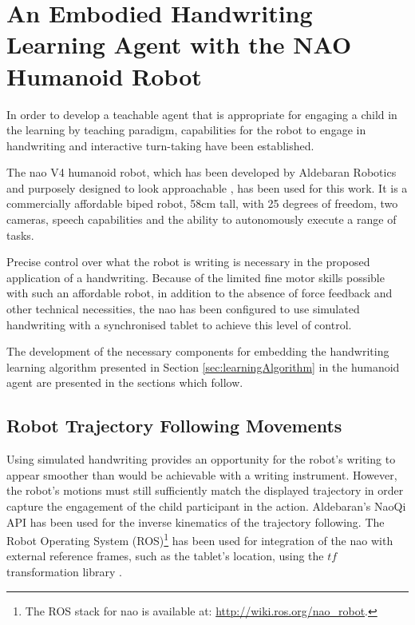 \documentclass{sig-alternate}
\begin{document}
\section{An Embodied Handwriting Learning Agent with the NAO Humanoid Robot}
\label{sec:robotWriting}

In order to develop a teachable agent that is appropriate for engaging a child
in the learning by teaching paradigm, 
capabilities for the robot to engage in handwriting and interactive turn-taking have been established.

The {\sc nao} V4 humanoid robot, which has been developed by Aldebaran Robotics and 
purposely designed to look approachable \cite{Gouaillier2008}, has been used for
this work. It is a commercially affordable biped robot, 58cm tall, with 25
degrees of freedom, two cameras, speech capabilities and the ability to
autonomously execute a range of tasks.

Precise control over what the robot is writing is necessary in the
proposed application of a handwriting. Because
of the limited fine motor skills possible with such an affordable robot, in
addition to the absence of force feedback and other technical necessities, the
{\sc nao} has been configured to use simulated handwriting with a synchronised tablet
to achieve this level of control. 

The development of the necessary components for embedding the handwriting learning
algorithm presented in Section \ref{sec:learningAlgorithm} in the humanoid agent
are presented in the sections which follow.

\subsection{Robot Trajectory Following Movements}

Using simulated handwriting provides an opportunity for the robot's writing to
appear smoother than would be achievable with a writing instrument. However, the
robot's motions must still sufficiently match the displayed trajectory in order
capture the engagement of the child participant in the action. Aldebaran's NaoQi API
has been used for the inverse kinematics of the trajectory following. The Robot
Operating System (ROS)\footnote{The ROS stack for {\sc nao} is available at:
\url{http://wiki.ros.org/nao_robot}.} has been used for integration of the {\sc nao}
with external reference frames, such as the tablet's location, 
using the $tf$ transformation library \cite{Foote2013}.
\end{document}
